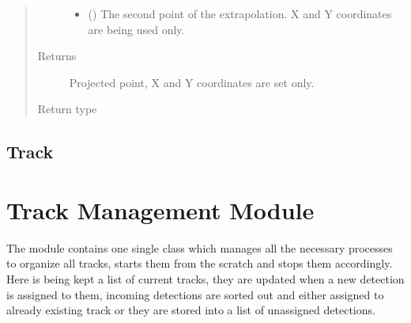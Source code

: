 \documentclass[letterpaper,10pt,english]{sphinxmanual}
\begin{document}
\begin{fulllineitems}
\begin{fulllineitems}
\begin{quote}
\begin{description}
\begin{itemize}
\item {} 
 ({\hyperref[\detokenize{datacontainers:data_containers.DetectionPoint}]{}}) \textendash{} The second point of the extrapolation. X and Y coordinates are being used only.

\end{itemize}

\item[{Returns}] \leavevmode
Projected point, X and Y coordinates are set only.

\item[{Return type}] \leavevmode
{\hyperref[\detokenize{datacontainers:data_containers.DetectionPoint}]{}}

\end{description}\end{quote}

\end{fulllineitems}


\end{fulllineitems}



\section{Track}
\label{\detokenize{datacontainers:track}}

\begin{fulllineitems}
\label{\detokenize{datacontainers:data_containers.Track}}
\end{fulllineitems}



\chapter{Track Management Module}
\label{\detokenize{trackmanagement::doc}}\label{\detokenize{trackmanagement:track-management-module}}
The module contains one single class which manages all the necessary processes to organize all tracks, starts them from
the scratch and stops them accordingly. Here is being kept a list of current tracks, they are updated when a new detection is
assigned to them, incoming detections are sorted out and either assigned to already existing track or they are stored into
a list of unassigned detections.
\label{\detokenize{trackmanagement:module-track_management}}
\end{document}
